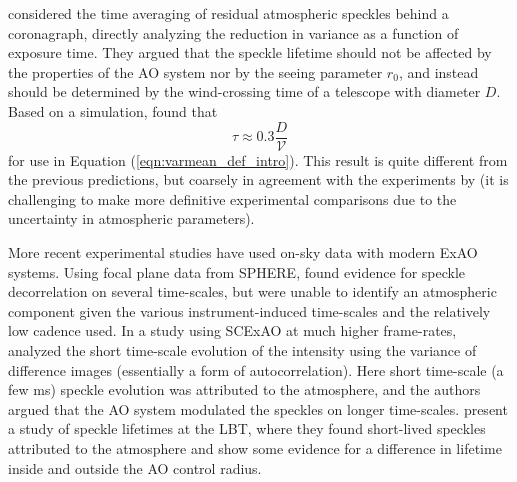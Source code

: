 \documentclass[11pt,preprint]{aastex}
\begin{document}
\citet{2005SPIE.5903..170M} considered the time averaging of residual atmospheric speckles behind a coronagraph, directly analyzing the reduction in variance as a function of exposure time.  They argued that the speckle lifetime should not be affected by the properties of the AO system nor by the seeing parameter $r_0$, and instead should be determined by the wind-crossing time of a telescope with diameter $D$.  Based on a simulation, \citet{2005SPIE.5903..170M} found that 
\begin{equation}
\tau \approx 0.3 \frac{D}{\mathcal{V}}
\end{equation}
for use in Equation (\ref{eqn:varmean_def_intro}).  This result is quite different from the previous predictions, but coarsely in agreement with the experiments by \citet{2006ApJ...637..541F} (it is challenging to make more definitive experimental comparisons due to the uncertainty in atmospheric parameters).


More recent experimental studies have used on-sky data with modern ExAO systems.  Using focal plane data from SPHERE, \citet{2016SPIE.9909E..4ZM} found evidence for speckle decorrelation on several time-scales, but were unable to identify an atmospheric component given the various instrument-induced time-scales and the relatively low cadence used. In a study using SCExAO at much higher frame-rates, \citet{2018PASP..130j4502G} analyzed the short time-scale evolution of the intensity using the variance of difference images (essentially a form of autocorrelation).  Here short time-scale (a few ms) speckle evolution was attributed to the atmosphere, and the authors argued that the AO system modulated the speckles on longer time-scales.  \citet{2017JATIS...3b5001S} present a study of speckle lifetimes at the LBT, where they found short-lived speckles attributed to the atmosphere and show some evidence for a difference in lifetime inside and outside the AO control radius.
\end{document}
